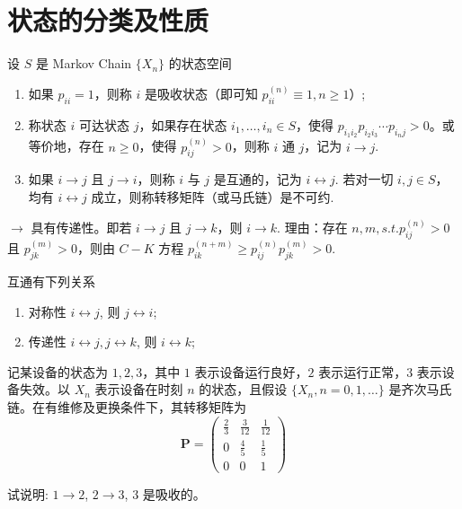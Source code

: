 \documentclass[lang=cn,10pt,thmcnt=section]{elegantbook}
\begin{document}
\section{状态的分类及性质}
\begin{definition}
	设 $S$ 是 Markov Chain $\{X_n\}$ 的状态空间
\begin{enumerate}
    \item 如果 $p_{ii} = 1$，则称 $i$ 是吸收状态（即可知 $p_{ii}^{(n)} \equiv 1, n \geq 1$）;
    \item 称状态 $i$ 可达状态 $j$，如果存在状态 $i_1, \ldots, i_n \in S$，使得 $p_{i_1 i_2} p_{i_2 i_3} \cdots p_{i_n j} > 0$。或等价地，存在 $n \geq 0$，使得 $p_{ij}^{(n)} > 0$，则称 $i$ 通 $j$，记为 $i \rightarrow j$.
    \item 如果 $i \rightarrow j$ 且 $j \rightarrow i$，则称 $i$ 与 $j$ 是互通的，记为 $i \leftrightarrow j$. 若对一切 $i, j \in S$，均有 $i \leftrightarrow j$ 成立，则称转移矩阵（或马氏链）是不可约.
\end{enumerate}
\end{definition}
\begin{remark}
	$\rightarrow$ 具有传递性。即若 $i \rightarrow j$ 且 $j \rightarrow k$，则 $i \rightarrow k$. 理由：存在 $n, m, s.t. p_{ij}^{(n)} > 0$ 且 $p_{jk}^{(m)} > 0$，则由 $C-K$ 方程 $p_{ik}^{(n+m)} \geq p_{ij}^{(n)} p_{jk}^{(m)} > 0$.
\end{remark}
\begin{proposition}
	互通有下列关系
\begin{enumerate}
    \item 对称性 $i \leftrightarrow j$, 则 $j \leftrightarrow i$;
    \item 传递性 $i \leftrightarrow j, j \leftrightarrow k$, 则 $i \leftrightarrow k$;
\end{enumerate}
\end{proposition}
\begin{example}
	记某设备的状态为 $1, 2, 3$，其中 $1$ 表示设备运行良好，$2$ 表示运行正常，$3$ 表示设备失效。以 $X_n$ 表示设备在时刻 $n$ 的状态，且假设 $\{X_n, n = 0, 1, \ldots\}$ 是齐次马氏链。在有维修及更换条件下，其转移矩阵为
\[
\mathbf{P} = 
\begin{pmatrix}
\frac{2}{3} & \frac{3}{12} & \frac{1}{12} \\
0 & \frac{4}{5} & \frac{1}{5} \\
0 & 0 & 1
\end{pmatrix}
\]

试说明: $1 \rightarrow 2$, $2 \rightarrow 3$, $3$ 是吸收的。
\end{example}
\end{document}
